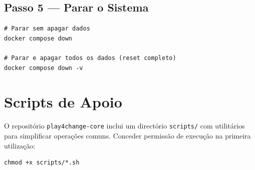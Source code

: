 \documentclass[12pt,a4paper]{article}
\newcommand{\file}[1]{\texttt{\small\color{darkgray}#1}}
\begin{document}
\subsection{Passo 5 — Parar o Sistema}

\begin{lstlisting}[style=bash]
# Parar sem apagar dados
docker compose down

# Parar e apagar todos os dados (reset completo)
docker compose down -v
\end{lstlisting}

\section{Scripts de Apoio}

O repositório \texttt{play4change-core} inclui um directório \file{scripts/} com utilitários para simplificar operações comuns. Conceder permissão de execução na primeira utilização:

\begin{lstlisting}[style=bash]
chmod +x scripts/*.sh
\end{lstlisting}
\end{document}
